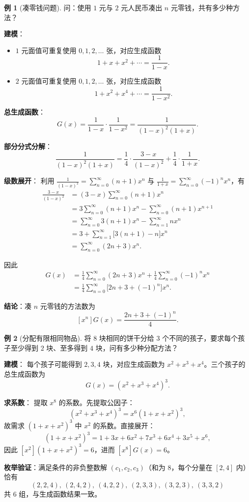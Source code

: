 \documentclass[UTF8,11pt,a4paper]{ctexbook}   %
\theoremstyle{definition}
\newtheorem{example}{例}[section]
\begin{document}
\begin{example}[凑零钱问题]\label{ex:change-making}
问：使用 $1$ 元与 $2$ 元人民币凑出 $n$ 元零钱，共有多少种方法？

\textbf{建模}：
\begin{itemize}
    \item $1$ 元面值可重复使用 $0,1,2,\dots$ 张，对应生成函数
    \[
    1+x+x^2+\cdots = \frac{1}{1-x}.
    \]
    \item $2$ 元面值可重复使用 $0,1,2,\dots$ 张，对应生成函数
    \[
    1+x^2+x^4+\cdots = \frac{1}{1-x^2}.
    \]
\end{itemize}

\textbf{总生成函数}：
\[
G(x) = \frac{1}{1-x}\cdot\frac{1}{1-x^2} = \frac{1}{(1-x)^2(1+x)}.
\]

\textbf{部分分式分解}：
\[
\frac{1}{(1-x)^2(1+x)} = \frac{1}{4}\cdot\frac{3-x}{(1-x)^2} + \frac{1}{4}\cdot\frac{1}{1+x}.
\]

\textbf{级数展开}：
利用 $\displaystyle\frac{1}{(1-x)^2}=\sum_{n=0}^{\infty}(n+1)x^n$ 与 $\displaystyle\frac{1}{1+x}=\sum_{n=0}^{\infty}(-1)^n x^n$，有
\begin{align*}
\frac{3-x}{(1-x)^2} &= (3-x)\sum_{n=0}^{\infty}(n+1)x^n \\
&= 3\sum_{n=0}^{\infty}(n+1)x^n - \sum_{n=0}^{\infty}(n+1)x^{n+1} \\
&= \sum_{n=0}^{\infty}3(n+1)x^n - \sum_{n=1}^{\infty}n x^n \\
&= 3 + \sum_{n=1}^{\infty}\bigl[3(n+1)-n\bigr]x^n \\
&= \sum_{n=0}^{\infty}(2n+3)x^n.
\end{align*}

因此
\begin{align*}
G(x) &= \frac{1}{4}\sum_{n=0}^{\infty}(2n+3)x^n + \frac{1}{4}\sum_{n=0}^{\infty}(-1)^n x^n \\
&= \frac{1}{4}\sum_{n=0}^{\infty}\bigl[2n+3+(-1)^n\bigr]x^n.
\end{align*}

\textbf{结论}：凑 $n$ 元零钱的方法数为
\[
\boxed{[x^n]G(x) = \frac{2n+3+(-1)^n}{4}}.
\]
\end{example}

\begin{example}[分配有限相同物品]\label{ex:cookies}
将 $8$ 块相同的饼干分给 $3$ 个不同的孩子，要求每个孩子至少得到 $2$ 块、至多得到 $4$ 块，问有多少种分配方法？

\textbf{建模}：
每个孩子可能得到 $2,3,4$ 块，对应生成函数为 $x^2+x^3+x^4$。三个孩子的总生成函数为
\[
G(x) = (x^2+x^3+x^4)^3.
\]

\textbf{求系数}：
提取 $x^8$ 的系数。先提取公因子：
\[
(x^2+x^3+x^4)^3 = x^6(1+x+x^2)^3,
\]
故需求 $(1+x+x^2)^3$ 中 $x^2$ 的系数。直接展开：
\[
(1+x+x^2)^3 = 1+3x+6x^2+7x^3+6x^4+3x^5+x^6,
\]
因此 $[x^2](1+x+x^2)^3 = 6$，进而 $[x^8]G(x)=6$。

\textbf{枚举验证}：满足条件的非负整数解 $(c_1,c_2,c_3)$（和为 $8$，每个分量在 $[2,4]$ 内）恰有
\[
(2,2,4),\ (2,4,2),\ (4,2,2),\ (2,3,3),\ (3,2,3),\ (3,3,2)
\]
共 $6$ 组，与生成函数结果一致。
\end{example}
\end{document}
